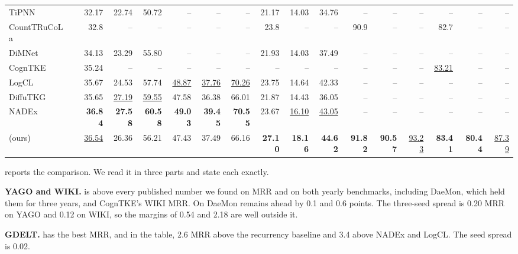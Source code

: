 \begin{table}[t]
{\begin{tabular}{l l rrr rrr rrr rrr rrr}
    TiPNN & \cite{dong2025dimnet} & 32.17 & 22.74 & 50.72 & -- & -- & -- & 21.17 & 14.03 & 34.76 & -- & -- & -- & -- & -- & -- \\
    CountTRuCoLa & \cite{gastinger2026counttrucola} & 32.8 & -- & -- & -- & -- & -- & 23.8 & -- & -- & 90.9 & -- & -- & 82.7 & -- & -- \\
    DiMNet & \cite{dong2025dimnet} & 34.13 & 23.29 & 55.80 & -- & -- & -- & 21.93 & 14.03 & 37.49 & -- & -- & -- & -- & -- & -- \\
    CognTKE & \cite{chen2025cogntke} & 35.24 & -- & -- & -- & -- & -- & -- & -- & -- & -- & -- & -- & \underline{83.21} & -- & -- \\
    LogCL & \cite{chen2024logcl} & 35.67 & 24.53 & 57.74 & \underline{48.87} & \underline{37.76} & \underline{70.26} & 23.75 & 14.64 & 42.33 & -- & -- & -- & -- & -- & -- \\
    DiffuTKG & \cite{nadex2026} & 35.65 & \underline{27.19} & \underline{59.55} & 47.58 & 36.38 & 66.01 & 21.87 & 14.43 & 36.05 & -- & -- & -- & -- & -- & -- \\
    NADEx & \cite{nadex2026} & \textbf{36.84} & \textbf{27.58} & \textbf{60.58} & \textbf{49.03} & \textbf{39.45} & \textbf{70.55} & 23.67 & \underline{16.10} & \underline{43.05} & -- & -- & -- & -- & -- & -- \\
    \midrule
    \model{} (ours) &  & \underline{36.54} & 26.36 & 56.21 & 47.43 & 37.49 & 66.16 & \textbf{27.10} & \textbf{18.16} & \textbf{44.62} & \textbf{91.82} & \textbf{90.57} & \underline{93.23} & \textbf{83.41} & \textbf{80.44} & \underline{87.39} \\
    \bottomrule
  \end{tabular}}
\end{table}

 reports the comparison. We read it in three parts and state each exactly.

\textbf{YAGO and WIKI.} \model{} is above every published number we found on MRR and \hone{} on both yearly benchmarks, including DaeMon, which held them for three years, and CognTKE's WIKI MRR. On \hten{} DaeMon remains ahead by 0.1 and 0.6 points. The three-seed spread is 0.20 MRR on YAGO and 0.12 on WIKI, so the \hone{} margins of 0.54 and 2.18 are well outside it.

\textbf{GDELT.} \model{} has the best MRR, \hone{} and \hten{} in the table, 2.6 MRR above the recurrency baseline and 3.4 above NADEx and LogCL. The seed spread is 0.02.

